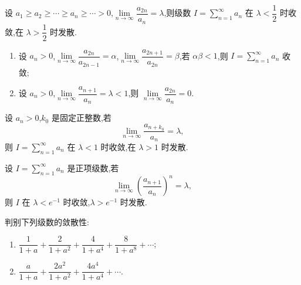 \documentclass[../../数学分析培优讲义.tex]{subfiles}
\begin{document}
\begin{example}
设 $a_1\geq a_2\geq\cdots\geq a_n\geq\cdots>0$,$\displaystyle\lim\limits_{n\to\infty}\dfrac{a_{2n}}{a_n}=\lambda$,则级数 $\displaystyle I=\sum\limits_{n=1}^{\infty}a_n$ 在 $\lambda<\dfrac{1}{2}$ 时收敛,在 $\lambda>\dfrac{1}{2}$ 时发散.
\end{example}
\exampleblank

\begin{example}
\begin{enumerate}[label=(\arabic*)]
    \item 设 $a_n>0$,$\displaystyle\lim\limits_{n\to\infty}\dfrac{a_{2n}}{a_{2n-1}}=\alpha$,$\displaystyle\lim\limits_{n\to\infty}\dfrac{a_{2n+1}}{a_{2n}}=\beta$,若 $\alpha\beta<1$,则 $\displaystyle I=\sum\limits_{n=1}^{\infty}a_n$ 收敛;
    \item 设 $a_n>0$,$\displaystyle\lim\limits_{n\to\infty}\dfrac{a_{n+1}}{a_n}=\lambda<1$,则 $\displaystyle\lim\limits_{n\to\infty}\dfrac{a_{2n}}{a_n}=0$.
\end{enumerate}
\end{example}
\exampleblank

\begin{example}
设 $a_n>0$,$k_0$ 是固定正整数,若
\[
    \lim\limits_{n\to\infty}\dfrac{a_{n+k_0}}{a_n}=\lambda,
\]
则 $\displaystyle I=\sum\limits_{n=1}^{\infty}a_n$ 在 $\lambda<1$ 时收敛,在 $\lambda>1$ 时发散.
\end{example}
\exampleblank

\begin{example}
设 $\displaystyle I=\sum\limits_{n=1}^{\infty}a_n$ 是正项级数,若
\[
    \lim\limits_{n\to\infty}\left(\dfrac{a_{n+1}}{a_n}\right)^n=\lambda,
\]
则 $I$ 在 $\lambda<e^{-1}$ 时收敛,$\lambda>e^{-1}$ 时发散.
\end{example}
\exampleblank

\begin{example}
判别下列级数的敛散性:
\begin{enumerate}[label=(\arabic*)]
    \item $\displaystyle\dfrac{1}{1+a}+\dfrac{2}{1+a^2}+\dfrac{4}{1+a^4}+\dfrac{8}{1+a^8}+\cdots$;
    \item $\displaystyle\dfrac{a}{1+a}+\dfrac{2a^2}{1+a^2}+\dfrac{4a^4}{1+a^4}+\cdots$.
\end{enumerate}
\end{example}
\exampleblank



\end{document}
